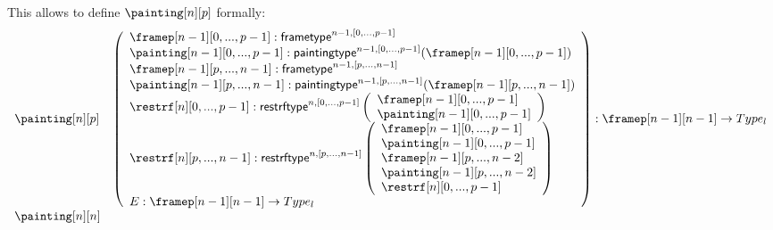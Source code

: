 \documentclass{msc}
\newcommand{\frametype}{\ensuremath{\mathsf{frametype}}}
\newcommand{\paintingtype}{\ensuremath{\mathsf{paintingtype}}}
\newcommand{\restrftype}{\ensuremath{\mathsf{restrftype}}}
\begin{document}
\begin{itemize}
        This allows to define $\painting[n][p]$ formally:
        $$
          \begin{array}{llcl}
            \painting[n][p]                                     &
            \multicolumn{3}{l}{
              \left(\begin{array}{l}
                        \framep[n-1][0,...,p-1]:\frametype^{n-1,[0,...,p-1]}                               \\
                        \painting[n-1][0,...,p-1]:\paintingtype^{n-1,[0,...,p-1]}(\framep[n-1][0,...,p-1]) \\
                        \framep[n-1][p,...,n-1]:\frametype^{n-1,[p,...,n-1]}                                     \\
                        \painting[n-1][p,...,n-1]:\paintingtype^{n-1,[p,...,n-1]}(\framep[n-1][p,...,n-1])           \\
                        \restrf[n][0,...,p-1]:\restrftype^{n,[0,...,p-1]}
                                \left(\begin{array}{l}
                                    \framep[n-1][0,...,p-1]  \\
                                    \painting[n-1][0,...,p-1] \\
                                  \end{array}\right) \\
                        \restrf[n][p,...,n-1]:\restrftype^{n,[p,...,n-1]}
                                \left(\begin{array}{l}
                                    \framep[n-1][0,...,p-1]  \\
                                    \painting[n-1][0,...,p-1] \\
                                    \framep[n-1][p,...,n-2]  \\
                                    \painting[n-1][p,...,n-2] \\
                                    \restrf[n][0,...,p-1] \\
                                  \end{array}\right) \\
                        E:\framep[n-1][n-1]\rightarrow Type_l\\
                      \end{array}\right) : \framep[n-1][n-1]\rightarrow Type_l
            }    \\
            \painting[n][n]                                           &

\end{array}$$
\end{itemize}
\end{document}
